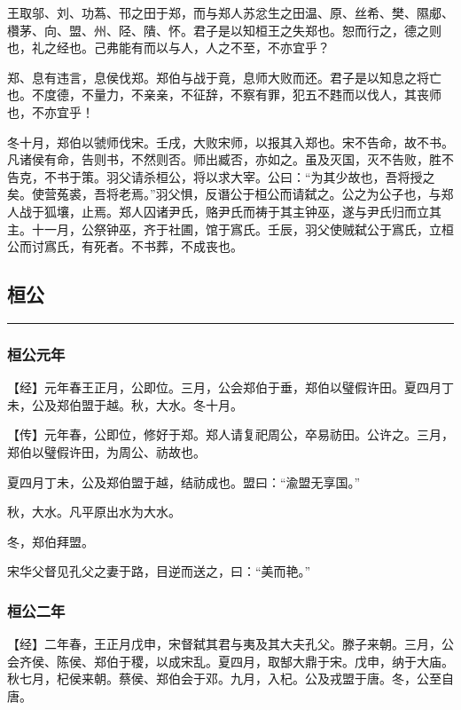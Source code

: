 \documentclass[]{article}
\begin{document}
王取邬、刘、功蒍、邗之田于郑，而与郑人苏忿生之田温、原、丝希、樊、隰郕、欑茅、向、盟、州、陉、隤、怀。君子是以知桓王之失郑也。恕而行之，德之则也，礼之经也。己弗能有而以与人，人之不至，不亦宜乎？

郑、息有违言，息侯伐郑。郑伯与战于竟，息师大败而还。君子是以知息之将亡也。不度德，不量力，不亲亲，不征辞，不察有罪，犯五不韪而以伐人，其丧师也，不亦宜乎！

冬十月，郑伯以虢师伐宋。壬戌，大败宋师，以报其入郑也。宋不告命，故不书。凡诸侯有命，告则书，不然则否。师出臧否，亦如之。虽及灭国，灭不告败，胜不告克，不书于策。羽父请杀桓公，将以求大宰。公曰：``为其少故也，吾将授之矣。使营菟裘，吾将老焉。''羽父惧，反谮公于桓公而请弑之。公之为公子也，与郑人战于狐壤，止焉。郑人囚诸尹氏，赂尹氏而祷于其主钟巫，遂与尹氏归而立其主。十一月，公祭钟巫，齐于社圃，馆于寪氏。壬辰，羽父使贼弑公于寪氏，立桓公而讨寪氏，有死者。不书葬，不成丧也。

\hypertarget{header-n157}{%
\subsection{桓公}\label{header-n157}}

\begin{center}\rule{0.5\linewidth}{\linethickness}\end{center}

\hypertarget{header-n159}{%
\subsubsection{桓公元年}\label{header-n159}}

【经】元年春王正月，公即位。三月，公会郑伯于垂，郑伯以璧假许田。夏四月丁未，公及郑伯盟于越。秋，大水。冬十月。

【传】元年春，公即位，修好于郑。郑人请复祀周公，卒易祊田。公许之。三月，郑伯以璧假许田，为周公、祊故也。

夏四月丁未，公及郑伯盟于越，结祊成也。盟曰：``渝盟无享国。''

秋，大水。凡平原出水为大水。

冬，郑伯拜盟。

宋华父督见孔父之妻于路，目逆而送之，曰：``美而艳。''

\hypertarget{header-n168}{%
\subsubsection{桓公二年}\label{header-n168}}

【经】二年春，王正月戊申，宋督弑其君与夷及其大夫孔父。滕子来朝。三月，公会齐侯、陈侯、郑伯于稷，以成宋乱。夏四月，取郜大鼎于宋。戊申，纳于大庙。秋七月，杞侯来朝。蔡侯、郑伯会于邓。九月，入杞。公及戎盟于唐。冬，公至自唐。
\end{document}
